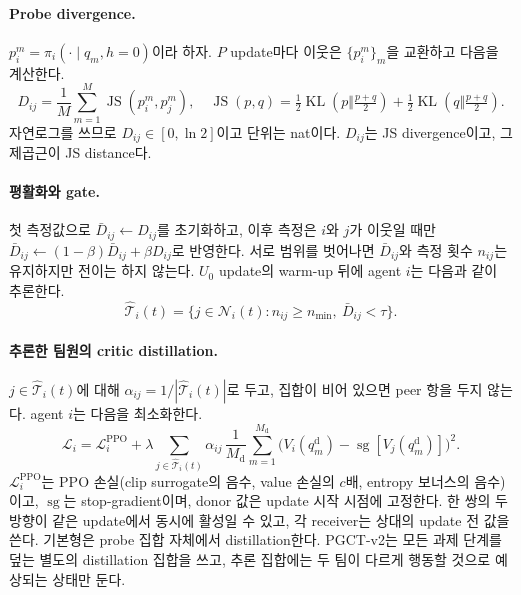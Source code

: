 \documentclass[twocolumn,10pt]{article}
\theoremstyle{remark}
\newcommand{\sg}{\operatorname{sg}}
\newcommand{\JS}{\operatorname{JS}}
\newcommand{\KL}{\operatorname{KL}}
\newcommand{\ours}{PGCT}
\begin{document}
\paragraph{Probe divergence.} $p_i^m=\pi_i(\cdot\mid q_m,h=0)$이라 하자. $P$ update마다 이웃은 $\{p_i^m\}_m$을 교환하고 다음을
계산한다.
\begin{equation}
  D_{ij}=\frac{1}{M}\sum_{m=1}^{M}\JS(p_i^m,p_j^m),\quad
  \JS(p,q)=\tfrac12\KL(p\Vert\tfrac{p+q}{2})+\tfrac12\KL(q\Vert\tfrac{p+q}{2}).
  \label{eq:div}
\end{equation}
자연로그를 쓰므로 $D_{ij}\in[0,\ln 2]$이고 단위는 nat이다. $D_{ij}$는 JS divergence이고, 그 제곱근이 JS distance다.

\paragraph{평활화와 gate.} 첫 측정값으로 $\bar D_{ij}\gets D_{ij}$를 초기화하고, 이후 측정은 $i$와 $j$가 이웃일 때만
$\bar D_{ij}\gets(1-\beta)\bar D_{ij}+\beta D_{ij}$로 반영한다. 서로 범위를 벗어나면 $\bar D_{ij}$와 측정 횟수 $n_{ij}$는
유지하지만 전이는 하지 않는다. $U_0$ update의 warm-up 뒤에 agent $i$는 다음과 같이 추론한다.
\begin{equation}
  \hat{\mathcal{T}}_i(t)=\{j\in\mathcal{N}_i(t): n_{ij}\ge n_{\min},\ \bar D_{ij}<\tau\}.
\end{equation}

\paragraph{추론한 팀원의 critic distillation.} $j\in\hat{\mathcal{T}}_i(t)$에 대해 $\alpha_{ij}=1/|\hat{\mathcal{T}}_i(t)|$로 두고,
집합이 비어 있으면 peer 항을 두지 않는다. agent $i$는 다음을 최소화한다.
\begin{equation}
  \mathcal{L}_i=\mathcal{L}^{\mathrm{PPO}}_i+\lambda\sum_{j\in\hat{\mathcal{T}}_i(t)}\alpha_{ij}\,
  \frac{1}{M_{\mathrm{d}}}\sum_{m=1}^{M_{\mathrm{d}}}\big(V_i(q^{\mathrm{d}}_m)-\sg[V_j(q^{\mathrm{d}}_m)]\big)^2.
  \label{eq:loss}
\end{equation}
$\mathcal{L}^{\mathrm{PPO}}_i$는 PPO 손실(clip surrogate의 음수, value 손실의 $c$배, entropy 보너스의 음수)이고, $\sg$는
stop-gradient이며, donor 값은 update 시작 시점에 고정한다. 한 쌍의 두 방향이 같은 update에서 동시에 활성일 수 있고, 각
receiver는 상대의 update 전 값을 쓴다. 기본형은 probe 집합 자체에서 distillation한다. \ours{}-v2는 모든 과제 단계를 덮는 별도의
distillation 집합을 쓰고, 추론 집합에는 두 팀이 다르게 행동할 것으로 예상되는 상태만 둔다.
\end{document}
